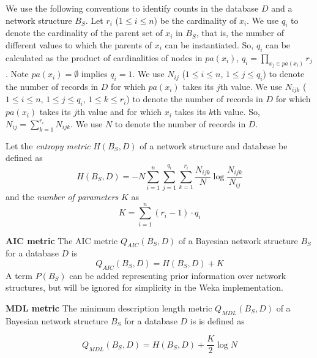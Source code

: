 We use the following conventions to identify counts in the database
$D$ and a network structure $B_S$.  Let $r_i$ ($1\le i\le n$) be the
cardinality of $x_i$.  We use $q_i$ to denote the cardinality of the
parent set of $x_i$ in $B_S$,  that is, the number of different values
to which the parents of $x_i$ can be  instantiated.  So, $q_i$ can be
calculated as the product of cardinalities of nodes in $pa(x_i)$,
$q_i=\prod_{x_j\in pa(x_i)}r_j$.  Note $pa(x_i)=\emptyset$ implies
$q_i=1$.
%
 We use $N_{ij}$ ($1\le i\le n$, $1\le j\le q_i$) to denote the number
of records in $D$ for which $pa(x_i)$ takes its $j$th value.%
We use $N_{ijk}$ ($1\le i\le n$, $1\le j\le q_i$, $1\le k\le r_i$) to
denote the number of records in $D$ for which $pa(x_i)$ takes its
$j$th value and for which $x_i$ takes its $k$th value.
%
So, $N_{ij}=\sum_{k=1}^{r_i}N_{ijk}$.  We use $N$ to denote the number
of records in $D$.

Let the {\em entropy metric} $H(B_S,D)$ of a network structure and database
be defined as
\begin{equation}\label{eq.H}
 H(B_S,D)=-N\sum_{i=1}^n\sum_{j=1}^{q_i}\sum_{k=1}^{r_i}\frac{N_{ijk}}{N}\log\frac{N_{ijk}}{N_{ij}}
\end{equation}
and the {\em number of parameters} $K$ as
\begin{equation}\label{eq.K}
K=\sum_{i=1}^n(r_i-1)\cdot q_i
\end{equation}

{\bf AIC metric} The AIC metric $Q_{AIC}(B_S,D)$ of a Bayesian network
structure $B_S$ for a database $D$ is
\begin{equation}\label{eq.AIC}
Q_{AIC}(B_S,D) = H(B_S,D)+K
\end{equation}
A term $P(B_S)$ can be added \cite{bouck1995} representing prior
information  over network structures, but will be ignored for
simplicity in the Weka implementation.


{\bf MDL metric} 
The minimum description length metric $Q_{MDL}(B_S,D)$
of a Bayesian network structure $B_S$ for a database $D$ is
is defined as

\begin{equation}\label{eq.MDL}
Q_{MDL}(B_S,D) = H(B_S,D)+\frac{K}{2}\log N
\end{equation}

